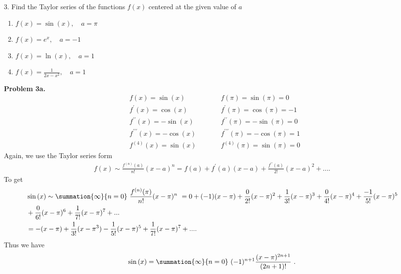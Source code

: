 \documentclass{report}
\begin{document}
    \bigbreak \noindent 
    \begin{mdframed}
        3. Find the Taylor series of the functions $f(x)$ centered at the given value of $a$
        \begin{enumerate}[label=(\alph*)]
            \item $f(x) = \sin{(x)}, \quad a=\pi $
            \item $f(x) = e^{x}, \quad  a =-1$
            \item $f(x) = \ln{(x)}, \quad  a = 1$
            \item $f(x) = \frac{1}{2x-x^{2}}, \quad  a = 1$
        \end{enumerate}
    \end{mdframed}
    \bigbreak \noindent 
    \textbf{Problem 3a.}
    \begin{equation}
    \begin{alignedat}{2}
        &f(x) = \sin{(x)} \quad \quad &&f(\pi) = \sin{(\pi)} = 0 \\
        &f^{\prime}(x) = \cos{(x)} \quad \quad &&f^{\prime}(\pi) = \cos{(\pi)} = -1 \\
        &f^{\prime\prime}(x) = -\sin{(x)} \quad \quad &&f^{\prime\prime}(\pi) = -\sin{(\pi)} = 0 \\
        &f^{\prime\prime\prime}(x) = -\cos{(x)} \quad \quad &&f^{\prime\prime\prime}(\pi) = -\cos{(\pi)} = 1 \\
        &f^{(4)}(x) = \sin{(x)} \quad \quad &&f^{(4)}(\pi) = \sin{(\pi)} = 0
    \end{alignedat}
    \end{equation}
    Again, we use the Taylor series form
    \begin{align*}
        f(x) \sim \frac{f^{(n)}(a)}{n!}(x-a)^{n} = f(a) + f^{\prime}(a)(x-a) + \frac{f^{\prime\prime}(a)}{2!}(x-a)^{2}  + ...
    .\end{align*}
    To get 
    \begin{align*}
        &\sin{(x)} \sim \summation{\infty}{n=0}\ \frac{f^{(n)}(\pi)}{n!}(x-\pi)^{n}\  = 0 + (-1)(x-\pi) + \frac{0}{2!}(x-\pi)^{2}+\frac{1}{3!}(x-\pi)^{3}  + \frac{0}{4!}(x-\pi)^{4} + \frac{-1}{5!}(x-\pi)^{5} \\ &+ \frac{0}{6!}(x-\pi)^{6} +\frac{1}{7!}(x-\pi)^{7} +...\\
        &=-(x-\pi)+ \frac{1}{3!}(x-\pi^{3})-\frac{1}{5!}(x-\pi)^{5}+\frac{1}{7!}(x-\pi)^{7} +...
    .\end{align*}
    \bigbreak \noindent 
    Thus we have
    \begin{align*}
        \sin{(x)} = \summation{\infty}{n=0}\ (-1)^{n+1}\frac{(x-\pi)^{2n+1}}{(2n+1)!}\  
    .\end{align*}
\end{document}
